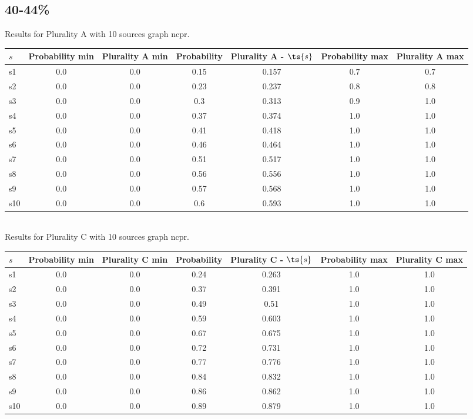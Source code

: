 \documentclass{article}
\begin{document}
\newpage

\subsection{40-44\%}

\noindent Results for Plurality A with 10 sources graph ncpr.

\noindent\begin{tabular}{|l|c|c|c|c|c|c|}
\hline
$s$& Probability min & Plurality A min & Probability & Plurality A - $\ts{s}$ & Probability max & Plurality A max\\
\hline
s1 &0.0 & 0.0 & 0.15 & 0.157 & 0.7 & 0.7\\
\hline
s2 &0.0 & 0.0 & 0.23 & 0.237 & 0.8 & 0.8\\
\hline
s3 &0.0 & 0.0 & 0.3 & 0.313 & 0.9 & 1.0\\
\hline
s4 &0.0 & 0.0 & 0.37 & 0.374 & 1.0 & 1.0\\
\hline
s5 &0.0 & 0.0 & 0.41 & 0.418 & 1.0 & 1.0\\
\hline
s6 &0.0 & 0.0 & 0.46 & 0.464 & 1.0 & 1.0\\
\hline
s7 &0.0 & 0.0 & 0.51 & 0.517 & 1.0 & 1.0\\
\hline
s8 &0.0 & 0.0 & 0.56 & 0.556 & 1.0 & 1.0\\
\hline
s9 &0.0 & 0.0 & 0.57 & 0.568 & 1.0 & 1.0\\
\hline
s10 &0.0 & 0.0 & 0.6 & 0.593 & 1.0 & 1.0\\
\hline
\end{tabular}\\

\noindent Results for Plurality C with 10 sources graph ncpr.

\noindent\begin{tabular}{|l|c|c|c|c|c|c|}
\hline
$s$& Probability min & Plurality C min & Probability & Plurality C - $\ts{s}$ & Probability max & Plurality C max\\
\hline
s1 &0.0 & 0.0 & 0.24 & 0.263 & 1.0 & 1.0\\
\hline
s2 &0.0 & 0.0 & 0.37 & 0.391 & 1.0 & 1.0\\
\hline
s3 &0.0 & 0.0 & 0.49 & 0.51 & 1.0 & 1.0\\
\hline
s4 &0.0 & 0.0 & 0.59 & 0.603 & 1.0 & 1.0\\
\hline
s5 &0.0 & 0.0 & 0.67 & 0.675 & 1.0 & 1.0\\
\hline
s6 &0.0 & 0.0 & 0.72 & 0.731 & 1.0 & 1.0\\
\hline
s7 &0.0 & 0.0 & 0.77 & 0.776 & 1.0 & 1.0\\
\hline
s8 &0.0 & 0.0 & 0.84 & 0.832 & 1.0 & 1.0\\
\hline
s9 &0.0 & 0.0 & 0.86 & 0.862 & 1.0 & 1.0\\
\hline
s10 &0.0 & 0.0 & 0.89 & 0.879 & 1.0 & 1.0\\
\hline
\end{tabular}\\
\end{document}
